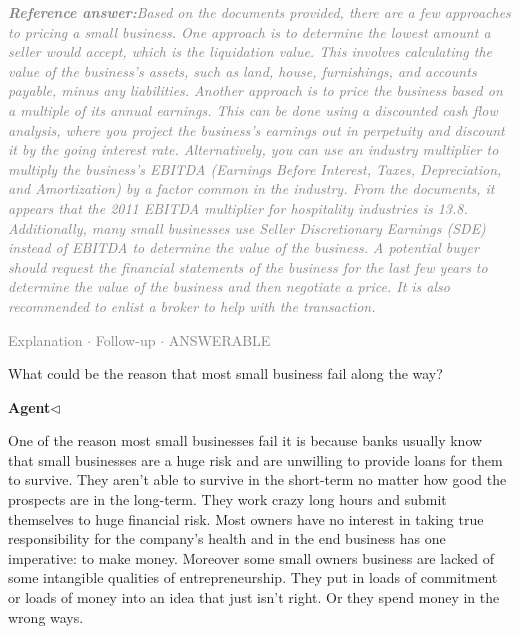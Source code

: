 \documentclass[a4paper,11pt]{article}
\begin{document}
\begin{refanswerenv}
{\footnotesize\textit{\textcolor{gray}{\textbf{Reference answer:}\enspace Based on the documents provided, there are a few approaches to pricing a small business. One approach is to determine the lowest amount a seller would accept, which is the liquidation value. This involves calculating the value of the business's assets, such as land, house, furnishings, and accounts payable, minus any liabilities. Another approach is to price the business based on a multiple of its annual earnings. This can be done using a discounted cash flow analysis, where you project the business's earnings out in perpetuity and discount it by the going interest rate. Alternatively, you can use an industry multiplier to multiply the business's EBITDA (Earnings Before Interest, Taxes, Depreciation, and Amortization) by a factor common in the industry. From the documents, it appears that the 2011 EBITDA multiplier for hospitality industries is 13.8. Additionally, many small businesses use Seller Discretionary Earnings (SDE) instead of EBITDA to determine the value of the business. A potential buyer should request the financial statements of the business for the last few years to determine the value of the business and then negotiate a price. It is also recommended to enlist a broker to help with the transaction.}}}
\end{refanswerenv}
\vspace{0.5em}
\hfill{\tiny\textcolor{gray}{Explanation $\cdot$ Follow-up $\cdot$ ANSWERABLE}}
\begin{userbubble}
What could be the reason that most small business fail along the way?
\end{userbubble}
\noindent\hfill{\small\textcolor{agentcolor}{\textbf{Agent\enspace$\triangleleft$}}}
\begin{agentbubble}
One of the reason most small businesses fail it is because banks usually know that small businesses are a huge risk and are unwilling to provide loans for them to survive. They aren't able to survive in the short-term no matter how good the prospects are in the long-term. They work crazy long hours and submit themselves to huge financial risk. Most owners have no interest in taking true responsibility for the company's health and in the end business has one imperative: to make money. Moreover some small owners business are lacked of some  intangible qualities of entrepreneurship. They  put in loads of commitment or loads of money into an idea that just isn't right. Or they spend money in the wrong ways.                                   
\end{agentbubble}
\end{document}
